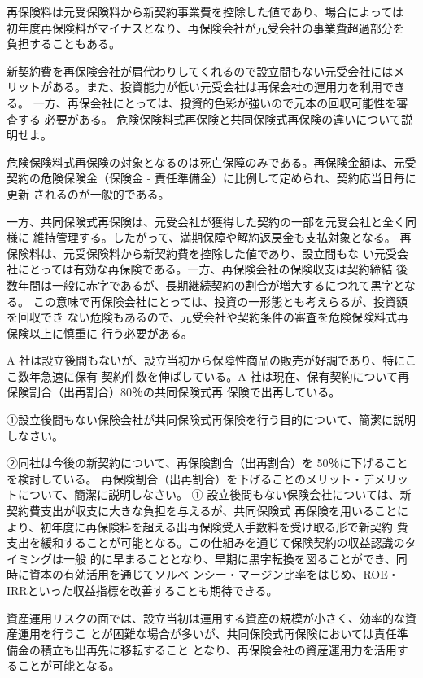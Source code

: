\documentclass[report,gutter=10mm,fore-edge=10mm,uplatex,dvipdfmx]{jlreq}
\begin{document}
再保険料は元受保険料から新契約事業費を控除した値であり、場合によっては
初年度再保険料がマイナスとなり、再保険会社が元受会社の事業費超過部分を
負担することもある。

新契約費を再保険会社が肩代わりしてくれるので設立間もない元受会社にはメ
リットがある。また、投資能力が低い元受会社は再保会社の運用力を利用できる。
一方、再保会社にとっては、投資的色彩が強いので元本の回収可能性を審査する
必要がある。
危険保険料式再保険と共同保険式再保険の違いについて説明せよ。
\answer{}

危険保険料式再保険の対象となるのは死亡保障のみである。再保険金額は、元受
契約の危険保険金（保険金 - 責任準備金）に比例して定められ、契約応当日毎に更新
されるのが一般的である。

一方、共同保険式再保険は、元受会社が獲得した契約の一部を元受会社と全く同様に
維持管理する。したがって、満期保障や解約返戻金も支払対象となる。
再保険料は、元受保険料から新契約費を控除した値であり、設立間もな
い元受会社にとっては有効な再保険である。一方、再保険会社の保険収支は契約締結
後数年間は一般に赤字であるが、長期継続契約の割合が増大するにつれて黒字となる。
この意味で再保険会社にとっては、投資の一形態とも考えらるが、投資額を回収でき
ない危険もあるので、元受会社や契約条件の審査を危険保険料式再保険以上に慎重に
行う必要がある。

A 社は設立後間もないが、設立当初から保障性商品の販売が好調であり、特にここ数年急速に保有
契約件数を伸ばしている。A 社は現在、保有契約について再保険割合（出再割合）80％の共同保険式再
保険で出再している。

①設立後間もない保険会社が共同保険式再保険を行う目的について、簡潔に説明しなさい。

②同社は今後の新契約について、再保険割合（出再割合）を 50％に下げることを検討している。
再保険割合（出再割合）を下げることのメリット・デメリットについて、簡潔に説明しなさい。
\answer{}
\noindent ①
設立後問もない保険会社については、新契約費支出が収支に大きな負担を与えるが、共同保険式
再保険を用いることにより、初年度に再保険料を超える出再保険受入手数料を受け取る形で新契約
費支出を緩和することが可能となる。この仕組みを通じて保険契約の収益認識のタイミングは一般
的に早まることとなり、早期に黒字転換を図ることができ、同時に資本の有効活用を通じてソルベ
ンシー・マージン比率をはじめ、ROE・IRRといった収益指標を改善することも期待できる。

資産運用リスクの面では、設立当初は運用する資産の規模が小さく、効率的な資産運用を行うこ
とが困難な場合が多いが、共同保険式再保険においては責任準備金の積立も出再先に移転すること
となり、再保険会社の資産運用力を活用することが可能となる。
\end{document}
